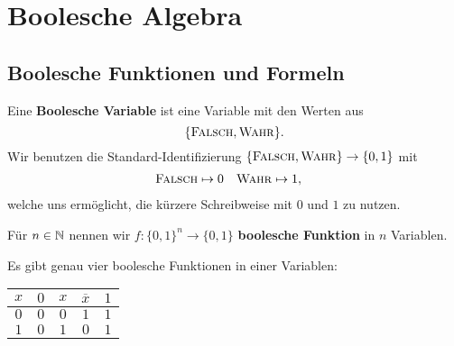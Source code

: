 \chapter{Boolesche Algebra}

\section{Boolesche Funktionen und Formeln} 

\begin{defn}
	Eine \textbf{Boolesche Variable} ist eine Variable mit den Werten aus 
	\[
		\{\mathop{\text{\textsc{Falsch}}},\mathop{\text{\textsc{Wahr}}}\}.
	\] Wir benutzen die Standard-Identifizierung $\{\mathop{\text{\textsc{Falsch}}},\mathop{\text{\textsc{Wahr}}}\} \to \{0,1\}$ mit 
	\begin{align*}
		 \mathop{\text{\textsc{Falsch}}} & \mapsto 0 & \mathop{\text{\textsc{Wahr}}} & \mapsto 1,
	\end{align*}
 welche uns ermöglicht, die kürzere Schreibweise mit $0$ und $1$ zu nutzen. 
\end{defn} 

\begin{defn}
	Für $n \in \mathbb{N}$ nennen wir $f: \{0,1\}^n \to \{0,1\}$ \textbf{boolesche Funktion} in $n$ Variablen. 
\end{defn} 

\begin{bem} Es gibt genau vier boolesche Funktionen in einer Variablen: 
	\begin{center}
			\begin{tabular}{c|cccc}
				$x$ & $0$ & $x$  & $\overline{x}$ & $1$ 
				\\ \hline 
				$0$ & $0$ & $0$ &  $1$ & $1$
				\\ $1$ & $0$ & $1$ & $0$ & $1$ 
			\end{tabular} 
	\end{center} 
\end{bem} 

